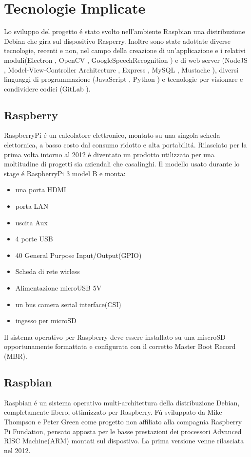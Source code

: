 \chapter{Tecnologie Implicate}

Lo sviluppo del progetto \'e stato svolto nell'ambiente Raspbian\cite{Raspbian}
una distribuzione Debian\cite{Debian} che gira sul dispositivo Rasperry\cite{Raspberry}.
Inoltre sono state adottate diverse tecnologie, recenti
e non, nel campo della creazione di un'applicazione e i relativi moduli(Electron \cite{Electron-website},
OpenCV \cite{OpenCV-website}, GoogleSpeechRecognition \cite{GoogleSTT-website})
e di web server (NodeJS \cite{NodeJS-website},  Model-View-Controller Architecture \cite{MVC-Architecture},
Express \cite{Express-website}, MySQL \cite{MySQL}, Mustache \cite{Mustache}),
diversi linguaggi di programmazione (JavaScript \cite{JavaScript}, Python \cite{Python})
e tecnologie per visionare e condividere codici (GitLab \cite{git-website}).

\section{Raspberry}
RaspberryPi \'e un calcolatore elettronico, montato su una singola scheda elettornica, a basso costo
dal consumo ridotto e alta portabilit\'a.
Rilasciato per la prima volta intorno al 2012 \'e diventato un prodotto utilizzato per una moltitudine
di progetti sia aziendali che casalinghi.
Il modello usato durante lo stage \'e RaspberryPi 3 model B e monta:
\begin{itemize}
\item una porta HDMI
\item porta LAN
\item uscita Aux
\item 4 porte USB
\item 40 General Purpose Input/Output(GPIO)
\item Scheda di rete wirless
\item Alimentazione microUSB 5V
\item un bus camera serial interface(CSI)
\item ingesso per microSD
\end{itemize}
Il sistema operativo per Raspberry deve essere installato su una miscroSD opportunamente formattata
e configurata con il corretto Master Boot Record (MBR).

\section{Raspbian}
Raspbian \'e un sistema operativo multi-architettura della distribuzione Debian, completamente libero,
ottimizzato per Raspberry.
F\'u sviluppato da Mike Thompson e Peter Green come progetto non affiliato alla compagnia Raspberry Pi
Fundation, pensato apposta per le basse prestazioni dei processori Advanced RISC Machine(ARM) montati sul
dispostivo.
La prima versione venne rilasciata nel 2012.

